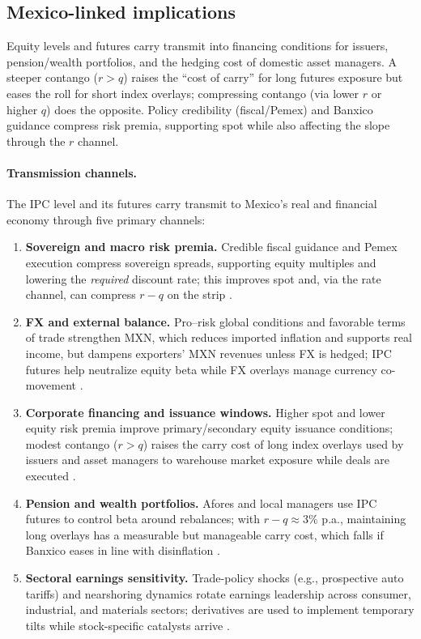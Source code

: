 \documentclass[11pt,a4paper]{article} %
\begin{document}
\subsection{Mexico-linked implications}
Equity levels and futures carry transmit into financing conditions for issuers, pension/wealth portfolios, and the hedging cost of domestic asset managers. A steeper contango (\(r>q\)) raises the “cost of carry” for long futures exposure but eases the roll for short index overlays; compressing contango (via lower \(r\) or higher \(q\)) does the opposite. Policy credibility (fiscal/Pemex) and Banxico guidance compress risk premia, supporting spot while also affecting the slope through the \(r\) channel.

\paragraph{Transmission channels.}
The IPC level and its futures carry transmit to Mexico’s real and financial economy through five primary channels:
\begin{enumerate}
  \item \textbf{Sovereign and macro risk premia.} Credible fiscal guidance and Pemex execution compress sovereign spreads, supporting equity multiples and lowering the \emph{required} discount rate; this improves spot and, via the rate channel, can compress \(r-q\) on the strip \citep{reuters_budget_2025,reuters_pemex_plan_2025}.
  \item \textbf{FX and external balance.} Pro–risk global conditions and favorable terms of trade strengthen MXN, which reduces imported inflation and supports real income, but dampens exporters’ MXN revenues unless FX is hedged; IPC futures help neutralize equity beta while FX overlays manage currency co-movement \citep{reuters_usdmxn_quote}.
  \item \textbf{Corporate financing and issuance windows.} Higher spot and lower equity risk premia improve primary/secondary equity issuance conditions; modest contango (\(r>q\)) raises the carry cost of long index overlays used by issuers and asset managers to warehouse market exposure while deals are executed \citep{spdj_ipc_page,spdj_bmv_methodology}.
  \item \textbf{Pension and wealth portfolios.} Afores and local managers use IPC futures to control beta around rebalances; with \(r-q\approx 3\%\) p.a., maintaining long overlays has a measurable but manageable carry cost, which falls if Banxico eases in line with disinflation \citep{bloomberg_mx_inflation_2025,mnd_inflation_band_2025}.
  \item \textbf{Sectoral earnings sensitivity.} Trade-policy shocks (e.g., prospective auto tariffs) and nearshoring dynamics rotate earnings leadership across consumer, industrial, and materials sectors; derivatives are used to implement temporary tilts while stock-specific catalysts arrive \citep{reuters_tariffs_china_autos_2025,reuters_border_jobs_2025}.
\end{enumerate}
\end{document}

